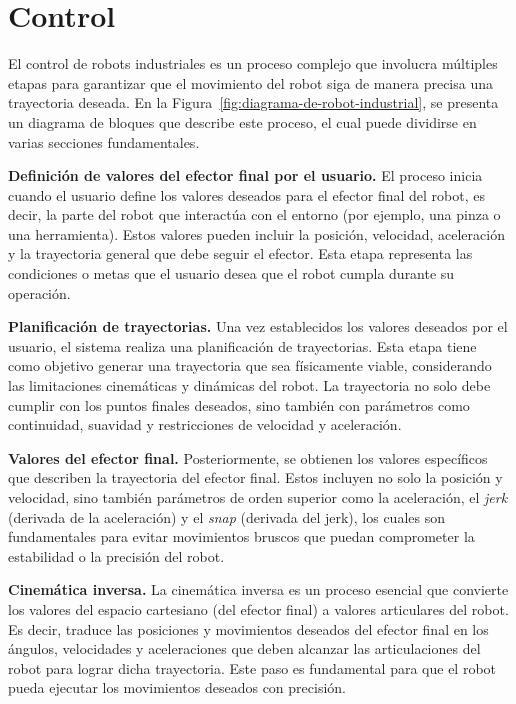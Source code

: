 \section{Control}

El control de robots industriales es un proceso complejo que involucra múltiples etapas para garantizar que el movimiento del robot siga de manera precisa una trayectoria deseada. En la Figura~\ref{fig:diagrama-de-robot-industrial}, se presenta un diagrama de bloques que describe este proceso, el cual puede dividirse en varias secciones fundamentales.

\textbf{Definición de valores del efector final por el usuario.} El proceso inicia cuando el usuario define los valores deseados para el efector final del robot, es decir, la parte del robot que interactúa con el entorno (por ejemplo, una pinza o una herramienta). Estos valores pueden incluir la posición, velocidad, aceleración y la trayectoria general que debe seguir el efector. Esta etapa representa las condiciones o metas que el usuario desea que el robot cumpla durante su operación.

\textbf{Planificación de trayectorias.} Una vez establecidos los valores deseados por el usuario, el sistema realiza una planificación de trayectorias. Esta etapa tiene como objetivo generar una trayectoria que sea físicamente viable, considerando las limitaciones cinemáticas y dinámicas del robot. La trayectoria no solo debe cumplir con los puntos finales deseados, sino también con parámetros como continuidad, suavidad y restricciones de velocidad y aceleración.

\textbf{Valores del efector final.} Posteriormente, se obtienen los valores específicos que describen la trayectoria del efector final. Estos incluyen no solo la posición y velocidad, sino también parámetros de orden superior como la aceleración, el \textit{jerk} (derivada de la aceleración) y el \textit{snap} (derivada del jerk), los cuales son fundamentales para evitar movimientos bruscos que puedan comprometer la estabilidad o la precisión del robot.

\textbf{Cinemática inversa.} La cinemática inversa es un proceso esencial que convierte los valores del espacio cartesiano (del efector final) a valores articulares del robot. Es decir, traduce las posiciones y movimientos deseados del efector final en los ángulos, velocidades y aceleraciones que deben alcanzar las articulaciones del robot para lograr dicha trayectoria. Este paso es fundamental para que el robot pueda ejecutar los movimientos deseados con precisión.

